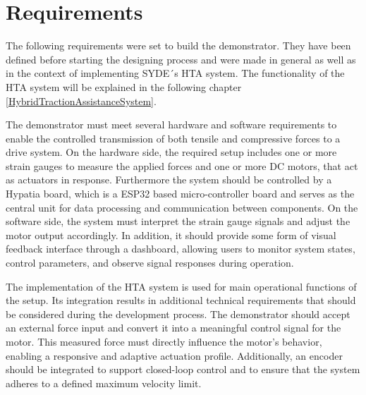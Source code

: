 \section{Requirements}
The following requirements were set to build the demonstrator. They have been defined before starting the designing process and were made in general as well as in the context of implementing SYDE´s \ac{HTA} system. The functionality of the \ac{HTA} system will be explained in the following chapter \ref{HybridTractionAssistanceSystem}.

The demonstrator must meet several hardware and software requirements to enable the controlled transmission of both tensile and compressive forces to a drive system. On the hardware side, the required setup includes one or more strain gauges \cite{ICStation:2017} to measure the applied forces and one or more \ac{DC} motors, that act as actuators in response. Furthermore the system should be controlled by a Hypatia board, which is a ESP32 \cite{Espressif:2024} based micro-controller board and serves as the central unit for data processing and communication between components. On the software side, the system must interpret the strain gauge signals and adjust the motor output accordingly. In addition, it should provide some form of visual feedback interface through a dashboard, allowing users to monitor system states, control parameters, and observe signal responses during operation.

The implementation of the \ac{HTA} system is used for main operational functions of the setup. Its integration results in additional technical requirements that should be considered during the development process. The demonstrator should accept an external force input and convert it into a meaningful control signal for the motor. This measured force must directly influence the motor’s behavior, enabling a responsive and adaptive actuation profile. Additionally, an encoder should be integrated to support closed-loop control and to ensure that the system adheres to a defined maximum velocity limit.

\newpage
